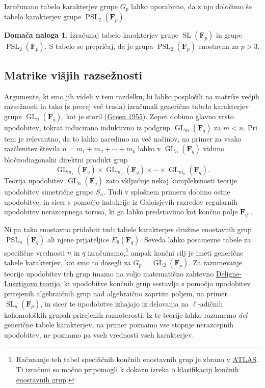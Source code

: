 \documentclass[11pt]{book}
\def\FF{\mathbf{F}}
\DeclareMathOperator\GL{GL}
\DeclareMathOperator\SL{SL}
\DeclareMathOperator\PSL{PSL}
\theoremstyle{definition}
\theoremstyle{zgled}
\theoremstyle{odprtproblem}
\theoremstyle{domacanaloga}
\newtheorem*{domacanaloga}{Domača naloga}
\theoremstyle{izrek}
\begin{document}
Izračunano tabelo karakterjev grupe $G_p$ lahko uporabimo, da z njo določimo še tabelo karakterjev grupe $\PSL_2(\FF_p)$.

\begin{domacanaloga}
Izračunaj tabelo karakterjev grupe $\SL(\FF_p)$ in grupe $\PSL_2(\FF_p)$. S tabelo se prepričaj, da je grupa $\PSL_2(\FF_p)$ enostavna za $p > 3$.
\end{domacanaloga}

\subsection{Matrike višjih razsežnosti}

Argumente, ki smo jih videli v tem razdelku, bi lahko posplošili na matrike večjih razsežnosti in tako (s precej več truda) izračunali generično tabelo karakterjev grupe $\GL_n(\FF_q)$, kot je storil \href{https://www.jstor.org/stable/1992997#metadata_info_tab_contents}{(Green 1955)}. Zopet dobimo glavno vrsto upodobitev, tokrat inducirano induktivno iz podgrup $\GL_m(\FF_q)$ za $m < n$. Pri tem je relevantno, da to lahko naredimo na več načinov, na primer za vsako razčlenitev števila $n = m_1 + m_2 + \cdots + m_k$ lahko v $\GL_n(\FF_q)$ vidimo bločnodiagonalni direktni produkt grup
\[
    \textstyle  \GL_{m_1}(\FF_q) \times \GL_{m_2}(\FF_q) \times \cdots \times \GL_{m_k}(\FF_q).  
\]
Teorija upodobitev $\GL_n(\FF_q)$ zato vključuje nekaj kompleksnosti teorije upodobitev simetrične grupe $S_n$. Tudi v splošnem primeru dobimo ostne upodobitve, in sicer s pomočjo indukcije iz Galoisjevih razredov regularnih upodobitev nerazcepnega torusa, ki ga lahko predstavimo kot končno polje $\FF_{q^n}$.

Ni pa tako enostavno pridobiti tudi tabele karakterjev družine enostavnih grup $\PSL_n(\FF_q)$ ali njene prijateljice $E_8(\FF_q)$. Seveda lahko posamezne tabele za specifične vrednosti $n$ in $q$ izračunamo,\footnote{Računanje teh tabel specifičnih končnih enostavnih grup je zbrano v \href{http://brauer.maths.qmul.ac.uk/Atlas/v3/}{ATLAS}. Ti izračuni so močno pripomogli k dokazu izreka o \href{https://en.wikipedia.org/wiki/Classification_of_finite_simple_groups}{klasifikaciji končnih enostavnih grup}.} ampak končni cilj je imeti generične tabele karakterjev, kot smo to dosegli za $G_p = \GL_2(\FF_p)$. Za razumevanje teorije upodobitev teh grup imamo na voljo matematično zahtevno \href{https://en.wikipedia.org/wiki/Deligne–Lusztig_theory}{Deligne-Lusztigovo teorijo}, ki upodobitve končnih grup sestavlja s pomočjo upodobitev prirejenih algebraičnih grup nad algebraično zaprtim poljem, na primer $\SL_n(\overline{\FF_p})$, in sicer te upodobitve izhajajo iz delovanja na $\ell$-adičnih kohomoloških grupah prirejenih raznoterosti. Iz te teorije lahko razumemo \emph{del} generične tabele karakterjev, na primer poznamo vse stopnje nerazcepnih upodobitev, ne poznamo pa vseh vrednosti vseh karakterjev.
\end{document}
